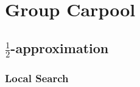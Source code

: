 % 
% 
% 
% 
% 
% 
% 
% 	
% 
% 	

\section{Group Carpool}
\label{sec:group}


	\subsection{$\frac{1}{2}$-approximation}
	
	\subsubsection{Local Search}
	
